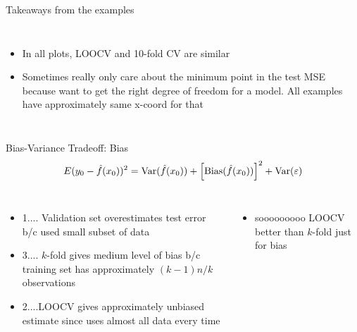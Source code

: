 \documentclass[aspectratio=169,usenames,dvipsnames]{beamer}
\newcommand{\InstructorList}[1]{
\begin{itemize}
	\color{orange}
	#1
\end{itemize}
}
\begin{document}
\begin{frame}[c]{Takeaways from the examples}

\begin{columns}
\centering
\InstructorList{
\item In all plots, LOOCV and 10-fold CV are similar
\item Sometimes really only care about the minimum point in the test MSE because want to get the right degree of freedom for a model. All examples have approximately same x-coord for that

}
\centering

\end{columns}

\end{frame}
\begin{frame}[t]{Bias-Variance Tradeoff: Bias}
	\begin{equation*}
		E(y_0 - \hat f (x_0))^2 = \mathrm{Var}(\hat f (x_0))
			+ \left[\mathrm{Bias}(\hat f(x_0)) \right] ^2
			+ \mathrm{Var}(\varepsilon)
	\end{equation*}
\begin{columns}
\centering
\InstructorList{
\item 1.... Validation set overestimates test error b/c used small subset of data
\item 3.... $k$-fold gives medium level of bias b/c training set has approximately $(k-1)n/k$ observations
\item 2....LOOCV gives approximately unbiased estimate since uses almost all data every time
}
\centering
\InstructorList{
\item sooooooooo LOOCV better than $k$-fold just for bias
}
\end{columns}

\end{frame}
\end{document}
